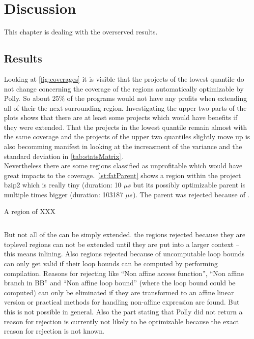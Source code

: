 \chapter{Discussion}
This chapter is dealing with the overserved results.

\section{Results}
Looking at \autoref{fig:coverages} it is visible that the projects of the lowest quantile do not change concerning the coverage of the regions automatically optimizable by Polly.
So about 25\% of the programs would not have any profits when extending all of their \scops the next surrounding region.
Investigating the upper two parts of the plots shows that there are at least some projects which would have benefits if they were extended.
That the projects in the lowest quantile remain almost with the same coverage and the projects of the upper two quantiles slightly move up is also becomming manifest in looking at the increasment of the variance and the standard deviation in \autoref{tab:statsMatrix}.\\
Nevertheless there are some regions classified as unprofitable which would have great impacts to the coverage.
\autoref{lst:fatParent} shows a region within the project bzip2 which is really tiny (duration: 10 \(\mu s\) but its possibly optimizable parent is multiple times bigger (duration: 103187 \(\mu s\)).
The parent was rejected because of .\\
\begin{code}
    \caption{A region of XXX}
    \inputminted{c++}{cpp/fatParent.cpp}
    \label{lst:fatParent}
\end{code}
But not all of the \scops can be simply extended.
\Eg the regions rejected because they are toplevel regions can not be extended until they are put into a larger context -- this means inlining.
Also regions rejected because of uncomputable loop bounds can only get valid if their loop bounds can be computed \eg by performing \jit compilation.
Reasons for rejecting like \enquote{Non affine access function}, \enquote{Non affine branch in BB} and \enquote{Non affine loop bound} (where the loop bound could be computed) can only be eliminated if they are transformed to an affine linear version or practical methods for handling non-affine expression are found.
But this is not possible in general. 
Also the part stating that Polly did not return a reason for rejection is currently not likely to be optimizable because the exact reason for rejection is not known.

